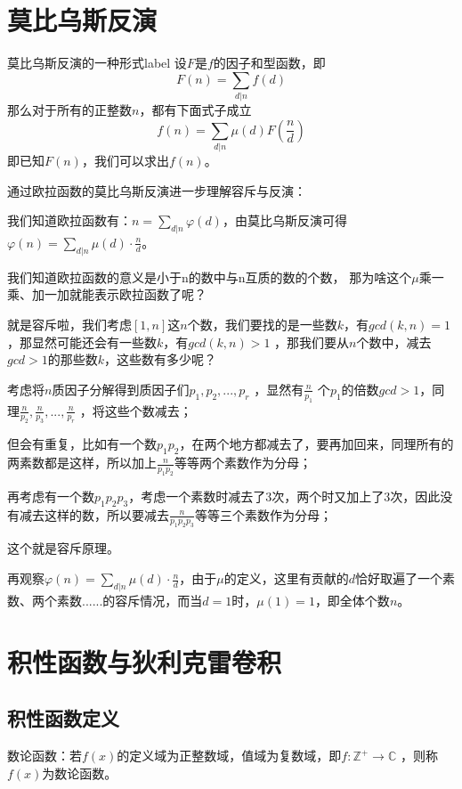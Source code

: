 



\section{莫比乌斯反演}
\begin{definition}{莫比乌斯反演的一种形式}{label}
设$F$是$f$的因子和型函数，即
$$
F(n)=\sum_{d|n}{f(d)}
$$
那么对于所有的正整数$n$，都有下面式子成立
$$
f(n)=\sum_{d|n}{\mu(d)F(\frac{n}{d})}
$$
即已知$F(n)$，我们可以求出$f(n)$。    
\end{definition}
   
{\heiti 通过欧拉函数的莫比乌斯反演进一步理解容斥与反演：}

我们知道欧拉函数有：$n=\sum_{d|n}\varphi(d)$，由莫比乌斯反演可得$\varphi(n)=\sum_{d|n}\mu(d)\cdot \frac{n}{d}$。

我们知道欧拉函数的意义是小于n的数中与n互质的数的个数，
那为啥这个$\mu$乘一乘、加一加就能表示欧拉函数了呢？

就是容斥啦，我们考虑$[1,n]$这$n$个数，我们要找的是一些数$k$，有$gcd(k,n)=1$，那显然可能还会有一些数$k$，有$gcd(k,n)>1$   ，那我们要从$n$个数中，减去$gcd>1$的那些数$k$，这些数有多少呢？

考虑将$n$质因子分解得到质因子们$p_1,p_2,...,p_r$ ，显然有$\frac{n}{p_1}$  个$p_1$的倍数$gcd>1$，同理$\frac{n}{p_2},\frac{n}{p_3},...,\frac{n}{p_r}$ ，将这些个数减去；

但会有重复，比如有一个数$p_1p_2$，在两个地方都减去了，要再加回来，同理所有的两素数都是这样，所以加上$\frac{n}{p_1p_2}$等等两个素数作为分母；

再考虑有一个数$p_1p_2p_3$，考虑一个素数时减去了3次，两个时又加上了3次，因此没有减去这样的数，所以要减去$\frac{n}{p_1p_2p_3}$等等三个素数作为分母；

这个就是{\heiti 容斥原理}。

再观察$\varphi(n)=\sum_{d|n}\mu(d)\cdot \frac{n}{d}$，由于$\mu$的定义，这里有贡献的$d$恰好取遍了一个素数、两个素数......的容斥情况，而当$d=1$时，$\mu(1)=1$，即全体个数$n$。


\section{积性函数与狄利克雷卷积}
\subsection{积性函数定义}
{\heiti 数论函数：}若$f(x)$的定义域为正整数域，值域为复数域，即$f:\mathbb{Z}^+  \rightarrow \mathbb{C}$ ，则称$f(x)$为数论函数。

